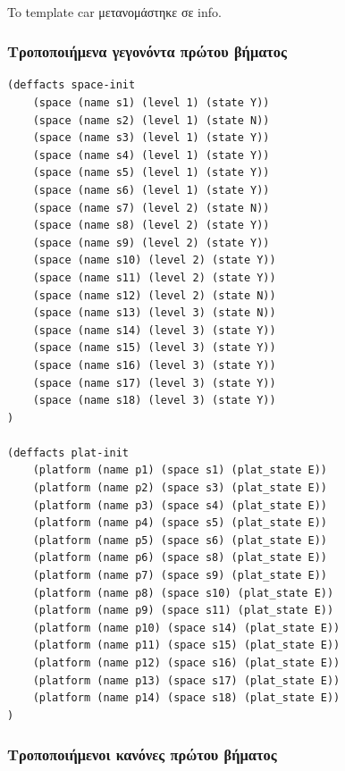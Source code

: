 \documentclass{article}
\begin{document}
    \paragraph{}
    To template car μετανομάστηκε σε info.

    \subsubsection{Τροποποιήμενα γεγονόντα πρώτου βήματος}
    \begin{lstlisting}
(deffacts space-init
    (space (name s1) (level 1) (state Y))
    (space (name s2) (level 1) (state N))
    (space (name s3) (level 1) (state Y))
    (space (name s4) (level 1) (state Y))
    (space (name s5) (level 1) (state Y))
    (space (name s6) (level 1) (state Y))
    (space (name s7) (level 2) (state N))
    (space (name s8) (level 2) (state Y))
    (space (name s9) (level 2) (state Y))
    (space (name s10) (level 2) (state Y))
    (space (name s11) (level 2) (state Y))
    (space (name s12) (level 2) (state N))
    (space (name s13) (level 3) (state N))
    (space (name s14) (level 3) (state Y))
    (space (name s15) (level 3) (state Y))
    (space (name s16) (level 3) (state Y))
    (space (name s17) (level 3) (state Y))
    (space (name s18) (level 3) (state Y))
)

(deffacts plat-init
    (platform (name p1) (space s1) (plat_state E))
    (platform (name p2) (space s3) (plat_state E))
    (platform (name p3) (space s4) (plat_state E))
    (platform (name p4) (space s5) (plat_state E))
    (platform (name p5) (space s6) (plat_state E))
    (platform (name p6) (space s8) (plat_state E))
    (platform (name p7) (space s9) (plat_state E))
    (platform (name p8) (space s10) (plat_state E))
    (platform (name p9) (space s11) (plat_state E))
    (platform (name p10) (space s14) (plat_state E))
    (platform (name p11) (space s15) (plat_state E))
    (platform (name p12) (space s16) (plat_state E))
    (platform (name p13) (space s17) (plat_state E))
    (platform (name p14) (space s18) (plat_state E))
)
    \end{lstlisting}

    \newpage
    \subsubsection{Τροποποιήμενοι κανόνες πρώτου βήματος}
\end{document}
